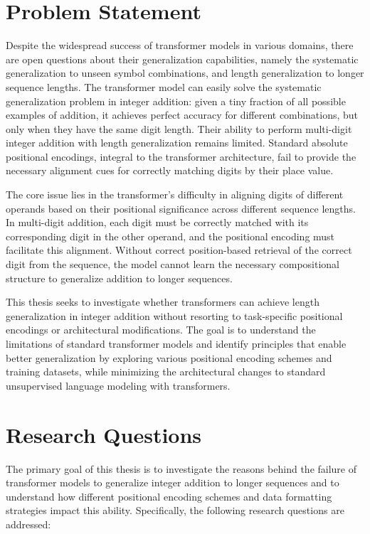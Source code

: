 \section{Problem Statement}

Despite the widespread success of transformer models in various domains, there are open questions about their generalization capabilities, namely the systematic generalization to unseen symbol combinations, and length generalization to longer sequence lengths. The transformer model can easily solve the systematic generalization problem in integer addition: given a tiny fraction of all possible examples of addition, it achieves perfect accuracy for different combinations, but only when they have the same digit length. Their ability to perform multi-digit integer addition with length generalization remains limited. Standard absolute positional encodings, integral to the transformer architecture, fail to provide the necessary alignment cues for correctly matching digits by their place value.

The core issue lies in the transformer's difficulty in aligning digits of different operands based on their positional significance across different sequence lengths. In multi-digit addition, each digit must be correctly matched with its corresponding digit in the other operand, and the positional encoding must facilitate this alignment. Without correct position-based retrieval of the correct digit from the sequence, the model cannot learn the necessary compositional structure to generalize addition to longer sequences.

This thesis seeks to investigate whether transformers can achieve length generalization in integer addition without resorting to task-specific positional encodings or architectural modifications. The goal is to understand the limitations of standard transformer models and identify principles that enable better generalization by exploring various positional encoding schemes and training datasets, while minimizing the architectural changes to standard unsupervised language modeling with transformers.

\section{Research Questions}\label{sec:research_questions}

The primary goal of this thesis is to investigate the reasons behind the failure of transformer models to generalize integer addition to longer sequences and to understand how different positional encoding schemes and data formatting strategies impact this ability. Specifically, the following research questions are addressed:

